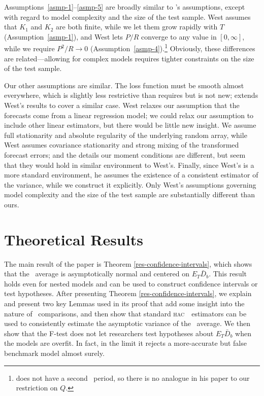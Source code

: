 \documentclass[11pt]{article}
\newcommand{\citepos}[1]{\citeauthor{#1}'s \citeyearpar{#1}}
\newcommand{\oosB}{\bar{D}_b}
\newcommand{\hac}{\textsc{hac}}
\begin{document}
Assumptions~\ref{asmp-1}--\ref{asmp-5} are broadly similar to
\citepos{Wes:96} assumptions, except with regard to model complexity
and the size of the test sample.  West assumes that $K_1$ and $K_2$
are both finite, while we let them grow rapidly with $T$
(Assumption~\ref{asmp-1}), and West lets $P/R$ converge to any value
in $[0,\infty]$, while we require $P^2/R \to 0$
(Assumption~\ref{asmp-4}).\footnote{\citet{Wes:96} does not have a
  second \oos\ period, so there is no analogue in his paper to our
  restriction on $Q$.}  Obviously, these differences are
related---allowing for complex models requires tighter constraints on
the size of the test sample.

Our other assumptions are similar.  The loss function must be smooth
almost everywhere, which is slightly less restrictive than
\citet{Wes:96} requires but is not new; \citet{Mcc:00} extends West's
results to cover a similar case.  West relaxes our assumption that the
forecasts come from a linear regression model; we could relax our
assumption to include other linear estimators, but there would be
little new insight.  We assume full stationarity and absolute
regularity of the underlying random array, while West assumes
covariance stationarity and strong mixing of the transformed forecast
errors; and the details our moment conditions are different, but seem
that they would hold in similar environment to West's.  Finally, since
West's is a more standard environment, he assumes the existence of a
consistent estimator of the variance, while we construct it
explicitly.  Only West's assumptions governing model complexity and
the size of the test sample are substantially different than ours.

\section{Theoretical Results}\label{sec:theory}
The main result of the paper is Theorem
\ref{res-confidence-intervals}, which shows that the \oos\ average is
asymptotically normal and centered on $E_T \oosB$.  This result
holds even for nested models and can be used to construct confidence
intervals or test hypotheses.  After presenting Theorem
\ref{res-confidence-intervals}, we explain and present two key Lemmas
used in its proof that add some insight into the nature of \oos\
comparisons, and then show that standard \hac\ \oos\ estimators can be
used to consistently estimate the asymptotic variance of the \oos\
average.  We then show that the F-test does not let researchers test
hypotheses about $E_{T} \oosB$ when the models are overfit.  In
fact, in the limit it rejects a more-accurate but false benchmark
model almost surely.
\end{document}
